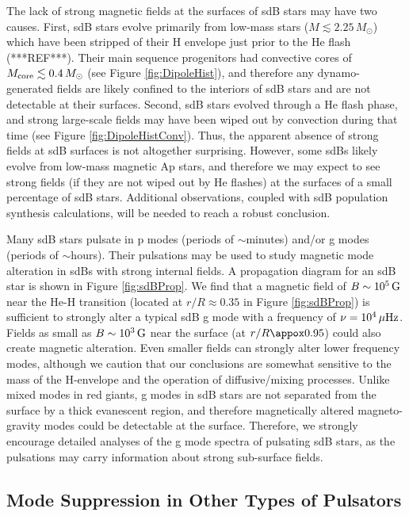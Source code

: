The lack of strong magnetic fields at the surfaces of sdB stars may have two causes. First, sdB stars evolve primarily from low-mass stars ($M \lesssim 2.25 \, M_\odot$) which have been stripped of their H envelope just prior to the He flash (***REF***). Their main sequence progenitors had convective cores of $M_{\rm core} \lesssim 0.4 \, M_\odot$ (see Figure \ref{fig:DipoleHist}), and therefore any dynamo-generated fields are likely confined to the interiors of sdB stars and are not detectable at their surfaces. Second, sdB stars evolved through a He flash phase, and strong large-scale fields may have been wiped out by convection during that time (see Figure \ref{fig:DipoleHistConv}). Thus, the apparent absence of strong fields at sdB surfaces is not altogether surprising. However, some sdBs likely evolve from low-mass magnetic Ap stars, and therefore we may expect to see strong fields (if they are not wiped out by He flashes) at the surfaces of a small percentage of sdB stars. Additional observations, coupled with sdB population synthesis calculations, will be needed to reach a robust conclusion.

Many sdB stars pulsate in p modes (periods of $\sim$minutes) and/or g modes (periods of $\sim$hours). Their pulsations may be used to study magnetic mode alteration in sdBs with strong internal fields. A propagation diagram for an sdB star is shown in Figure \ref{fig:sdBProp}. We find that a magnetic field of $B\sim 10^5 \, {\rm G}$ near the He-H transition (located at $r/R \approx 0.35$ in Figure \ref{fig:sdBProp}) is sufficient to strongly alter a typical sdB g mode with a frequency of $\nu = 10^4 \, \mu {\rm Hz}$. Fields as small as $B\sim 10^3 \, {\rm G}$ near the surface (at $r/R \appox 0.95$) could also create magnetic alteration. Even smaller fields can strongly alter lower frequency modes, although we caution that our conclusions are somewhat sensitive to the mass of the H-envelope and the operation of diffusive/mixing processes. Unlike mixed modes in red giants, g modes in sdB stars are not separated from the surface by a thick evanescent region, and therefore magnetically altered magneto-gravity modes could be detectable at the surface. Therefore, we strongly encourage detailed analyses of the g mode spectra of pulsating sdB stars, as the pulsations may carry information about strong sub-surface fields. 



\subsection{Mode Suppression in Other Types of Pulsators}
  
